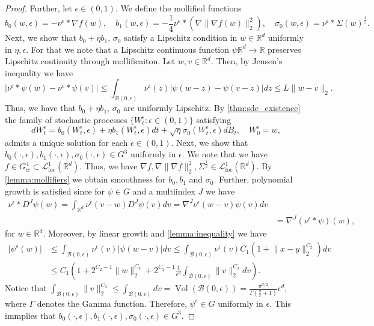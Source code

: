 \documentclass[12pt]{article}
\theoremstyle{definition}
\numberwithin{equation}{section}
\newcommand{\R}{\mathbb{R}}
\newcommand{\CL}{\mathcal{L}}
\newcommand{\CB}{\mathcal{B}}
\newcommand{\moll}{\nu^{\epsilon}}
\newcommand{\norm}[1]{\lVert{#1}\rVert_2}
\DeclareMathOperator{\vol}{Vol}
\begin{document}
\begin{proof}
  Further, let $\epsilon \in (0,1)$. We define the mollified functions
  \begin{equation*}
    b_0(w, \epsilon) = - \moll * \nabla f(w), \quad b_1(w, \epsilon) = -\frac{1}{4}\moll * (\nabla\norm{\nabla f(w)}^2), \quad \sigma_0(w, \epsilon) = \moll * \Sigma(w)^{\frac{1}{2}}.
  \end{equation*}
  Next, we show that $b_0 + \eta b_1$, $\sigma_0$ satisfy a Lipschitz condition in $w \in \R^d$ uniformly in $\eta, \epsilon$.
  For that we note that a Lipschitz continuous function $\psi \R^d \rightarrow \R$ preserves Lipschitz continuity through mollificaiton. Let $w, v \in \R^d$. Then, by Jensen's inequality we have
  \begin{equation*}
    \lvert\moll*\psi(w) - \moll*\psi(v) \rvert \leq \int_{\CB(0,\epsilon)}\moll(z)\lvert\psi(w-z) - \psi(v-z)\rvert dz \leq L \norm{w-v}.
  \end{equation*}
  Thus, we have that $b_0 + \eta b_1$, $\sigma_0$ are uniformly Lipschitz. 
  By \autoref{thm:sde_existence} the family of stochastic processes $\{W_t^{\epsilon}: \epsilon \in (0,1)\}$ satisfying 
  \begin{equation*}
    dW_t^{\epsilon} = b_0(W_t^{\epsilon}, \epsilon) + \eta b_1(W_t^{\epsilon}, \epsilon)dt + \sqrt{\eta} \sigma_0(W_t^{\epsilon}, \epsilon)dB_t, \quad W_0^{\epsilon} = w,
  \end{equation*}
  admits a unique solution for each $\epsilon \in (0,1)$.
  Next, we show that $b_0(\cdot, \epsilon),b_1(\cdot, \epsilon),\sigma_0(\cdot, \epsilon) \in G^3$ uniformly in $\epsilon$.
  We note that we have $f \in G^4_w \subset \CL^1_{\text{loc}}(\R^d)$. Thus, we have $\nabla f, \nabla \norm{\nabla f}^2, \Sigma^{\frac{1}{2}} \in \CL^1_{\text{loc}}(\R^d)$. By \autoref{lemma:mollifiers} we obtain smoothness for $b_0, b_1$ and $\sigma_0$. Further, polynomial growth is satisfied since for $\psi \in G$ and a multiindex $J$ we have
  \begin{align*}
    \moll * D^J \psi (w) = \int_{\R^d}\moll(v-w) D^J \psi (v)dv = \nabla^J\moll(w-v)\psi (v) dv \\
    &= \nabla^J(\moll * \psi)(w),
  \end{align*}
  for $w \in \R^d$.
  Moreover, by linear growth and \autoref{lemma:inequality} we have
  \begin{align*}
    \lvert \psi^{\epsilon}(w) \rvert &\leq \int_{\CB(0, \epsilon)} \moll(v) \lvert \psi(w-v) \rvert dv \leq \int_{\CB(0, \epsilon)} \moll(v) C_1 (1 + \norm{x-y}^{C_2})dv\\
    &\leq C_1\left(1 + 2^{C_2 - 1} \norm{w}^{C_2} + 2^{C_2 - 1}\frac{1}{\epsilon^d}\int_{\CB(0,\epsilon)}\norm{v}^{C_2}dv\right).
  \end{align*}
  Notice that $\int_{\CB(0,\epsilon)}\norm{v}^{C_2} \leq \int_{\CB(0,\epsilon)}dv = \vol(\CB(0,\epsilon)) = \frac{\pi^{d/2}}{\Gamma(\frac{d}{2}+1)}\epsilon^d$, where $\Gamma$ denotes the Gamma function. Therefore, $\psi^{\epsilon} \in G$ uniformly in $\epsilon$.
  This immplies that $b_0(\cdot,\epsilon), b_1(\cdot,\epsilon), \sigma_0(\cdot, \epsilon) \in G^3$.
\end{proof}
\end{document}
